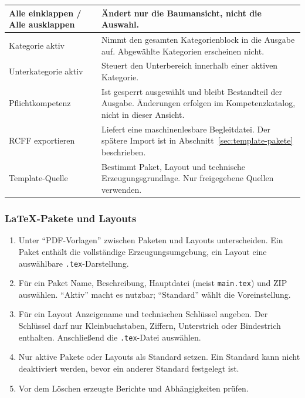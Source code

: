 \documentclass[12pt,a4paper]{article}
\begin{document}
\begin{tabularx}{\textwidth}{|p{}|X|}
\hline
Alle einklappen / Alle ausklappen & Ändert nur die Baumansicht, nicht die Auswahl.\\
\hline
Kategorie aktiv & Nimmt den gesamten Kategorienblock in die Ausgabe auf. Abgewählte Kategorien erscheinen nicht.\\
\hline
Unterkategorie aktiv & Steuert den Unterbereich innerhalb einer aktiven Kategorie.\\
\hline
Pflichtkompetenz & Ist gesperrt ausgewählt und bleibt Bestandteil der Ausgabe. Änderungen erfolgen im Kompetenzkatalog, nicht in dieser Ansicht.\\
\hline
RCFF exportieren & Liefert eine maschinenlesbare Begleitdatei. Der spätere Import ist in Abschnitt~\ref{sec:template-pakete} beschrieben.\\
\hline
Template-Quelle & Bestimmt Paket, Layout und technische Erzeugungsgrundlage. Nur freigegebene Quellen verwenden.\\
\hline
\end{tabularx}

\subsubsection{LaTeX-Pakete und Layouts}
\begin{enumerate}
  \item Unter \enquote{PDF-Vorlagen} zwischen Paketen und Layouts unterscheiden. Ein Paket enthält die vollständige Erzeugungsumgebung, ein Layout eine auswählbare \texttt{.tex}-Darstellung.
  \item Für ein Paket Name, Beschreibung, Hauptdatei (meist \texttt{main.tex}) und ZIP auswählen. \enquote{Aktiv} macht es nutzbar; \enquote{Standard} wählt die Voreinstellung.
  \item Für ein Layout Anzeigename und technischen Schlüssel angeben. Der Schlüssel darf nur Kleinbuchstaben, Ziffern, Unterstrich oder Bindestrich enthalten. Anschließend die \texttt{.tex}-Datei auswählen.
  \item Nur aktive Pakete oder Layouts als Standard setzen. Ein Standard kann nicht deaktiviert werden, bevor ein anderer Standard festgelegt ist.
  \item Vor dem Löschen erzeugte Berichte und Abhängigkeiten prüfen.
\end{enumerate}
\end{document}
